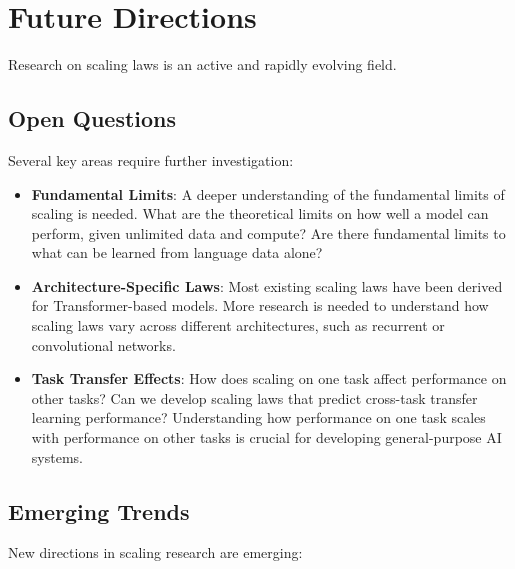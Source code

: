 \section{Future Directions}
\label{sec:future_directions}

Research on scaling laws is an active and rapidly evolving field.

\subsection{Open Questions}
\noindent
Several key areas require further investigation:
\begin{itemize}[noitemsep]
    \item \textbf{Fundamental Limits}:  A deeper understanding of the fundamental limits of scaling is needed. What are the theoretical limits on how well a model can perform, given unlimited data and compute? Are there fundamental limits to what can be learned from language data alone?
    \item \textbf{Architecture-Specific Laws}:  Most existing scaling laws have been derived for Transformer-based models. More research is needed to understand how scaling laws vary across different architectures, such as recurrent or convolutional networks.
    \item \textbf{Task Transfer Effects}:  How does scaling on one task affect performance on other tasks? Can we develop scaling laws that predict cross-task transfer learning performance? Understanding how performance on one task scales with performance on other tasks is crucial for developing general-purpose AI systems.
\end{itemize}

\subsection{Emerging Trends}
\noindent
New directions in scaling research are emerging:

